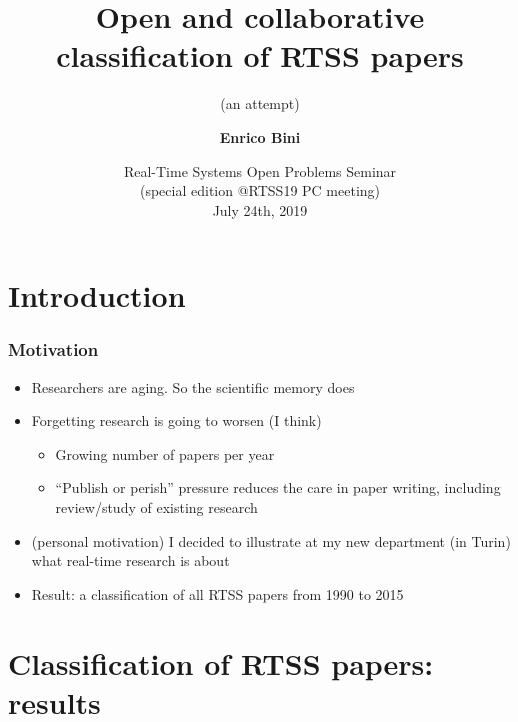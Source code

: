 \documentclass[ignorenonframetext,mathserif]{beamer} %
\title[Classification of RTSS papers]
{Open and collaborative classification of RTSS papers}
\subtitle{(an attempt)}
\author[E. Bini]{\textbf{Enrico Bini}}
\institute[UniTo, Torino, Italy]{University of Turin}
\date[RTOPS'19, 24/07/2019]{Real-Time Systems Open Problems Seminar\\
{\small (special edition @RTSS19 PC meeting)}\\ July 24th, 2019}
\begin{document}
\begin{frame}
  \titlepage
\end{frame}





\section{Introduction}

\begin{frame}
  \frametitle{Motivation}
  \begin{itemize}
  \item Researchers are aging. So the scientific memory does
  \item Forgetting research is going to worsen (I think)
    \begin{itemize}
    \item Growing number of papers per year
    \item ``Publish or perish'' pressure reduces the care in paper
      writing, including review/study of existing research
    \end{itemize}
  \item (personal motivation) I decided to illustrate at my new
    department (in Turin) what real-time research is about
  \item Result: a classification of all RTSS papers from 1990 to 2015
  \end{itemize}
\end{frame}

\section{Classification of RTSS papers: results}
\end{document}
